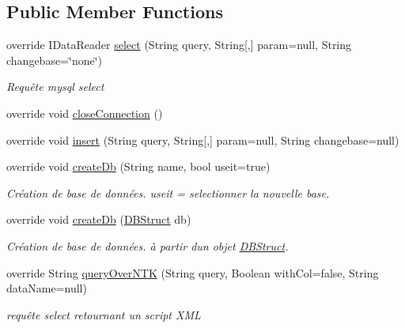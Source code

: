 \subsection*{Public Member Functions}
\begin{DoxyCompactItemize}
\item 
override I\+Data\+Reader \mbox{\hyperlink{class_n_t_k_1_1_database_1_1_n_t_k_d___my_sql_a6bc15aca0b212fdc2e912f8604b7ad25}{select}} (String query, String\mbox{[},\mbox{]} param=null, String changebase=\char`\"{}none\char`\"{})
\begin{DoxyCompactList}\small\item\em Requête mysql select \end{DoxyCompactList}\item 
override void \mbox{\hyperlink{class_n_t_k_1_1_database_1_1_n_t_k_d___my_sql_a8ff8d325a1abf1959991426391cd9eab}{close\+Connection}} ()
\item 
override void \mbox{\hyperlink{class_n_t_k_1_1_database_1_1_n_t_k_d___my_sql_aed2c5b6ef4213f49ed790de285280588}{insert}} (String query, String\mbox{[},\mbox{]} param=null, String changebase=null)
\item 
override void \mbox{\hyperlink{class_n_t_k_1_1_database_1_1_n_t_k_d___my_sql_a6a33910d27ce2b66e2e0d2bf87469c33}{create\+Db}} (String name, bool useit=true)
\begin{DoxyCompactList}\small\item\em Création de base de données. useit = selectionner la nouvelle base. \end{DoxyCompactList}\item 
override void \mbox{\hyperlink{class_n_t_k_1_1_database_1_1_n_t_k_d___my_sql_a347640f64619882109ed1e4642f441d7}{create\+Db}} (\mbox{\hyperlink{class_n_t_k_1_1_database_1_1_d_b_struct}{D\+B\+Struct}} db)
\begin{DoxyCompactList}\small\item\em Création de base de données. à partir d\textquotesingle{}un objet \mbox{\hyperlink{class_n_t_k_1_1_database_1_1_d_b_struct}{D\+B\+Struct}}. \end{DoxyCompactList}\item 
override String \mbox{\hyperlink{class_n_t_k_1_1_database_1_1_n_t_k_d___my_sql_a763eb62cfacbe0f0a519e6f744560da8}{query\+Over\+N\+TK}} (String query, Boolean with\+Col=false, String data\+Name=null)
\begin{DoxyCompactList}\small\item\em requête select retournant un script X\+ML \end{DoxyCompactList}\item 

\end{DoxyCompactItemize}
